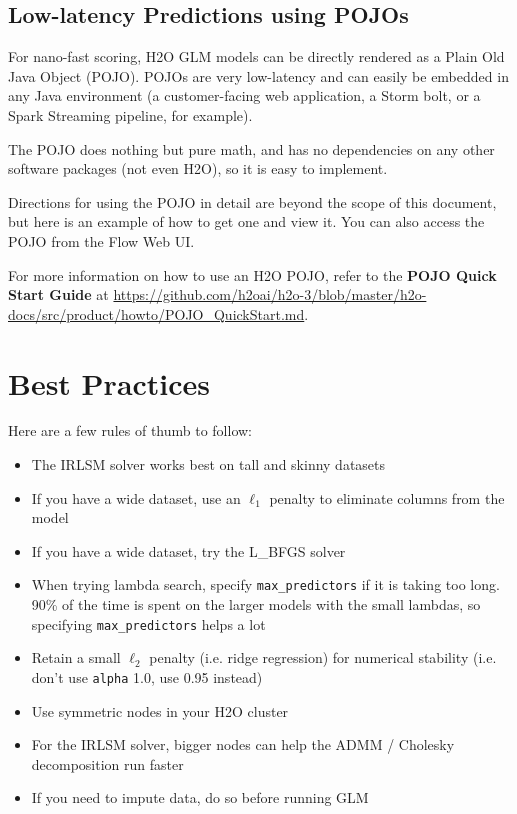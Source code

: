 \subsection{Low-latency Predictions using POJOs}

For nano-fast scoring, H2O GLM models can be directly rendered as a Plain Old Java Object (POJO).  POJOs are very
low-latency and can easily be embedded in any Java environment (a customer-facing web application, a Storm bolt,
or a Spark Streaming pipeline, for example).

The POJO does nothing but pure math, and has no dependencies on any other software packages (not even H2O),
so it is easy to implement.

Directions for using the POJO in detail are beyond the scope of this document, but here is an example of how to get
one and view it.  You can also access the POJO from the Flow Web UI.

For more information on how to use an H2O POJO, refer to the \textbf{POJO Quick Start Guide} at {\url{https://github.com/h2oai/h2o-3/blob/master/h2o-docs/src/product/howto/POJO_QuickStart.md}}. 

\bigskip
\waterExampleInR




\section{Best Practices}

Here are a few rules of thumb to follow:

\begin{itemize}
\item The IRLSM solver works best on tall and skinny datasets
\item If you have a wide dataset, use an  $\ell_1$ penalty to eliminate columns from the model
\item If you have a wide dataset, try the L\_BFGS solver
\item When trying lambda search, specify \texttt{max\_predictors} if it is taking too long. 90\% of the time is spent on the larger models with the small lambdas, so specifying \texttt{max\_predictors} helps a lot
\item Retain a small  $\ell_2$ penalty (i.e. ridge regression) for numerical stability (i.e. don’t use \texttt{alpha} 1.0, use 0.95 instead)
\item Use symmetric nodes in your H2O cluster
\item For the IRLSM solver, bigger nodes can help the ADMM / Cholesky decomposition run faster
\item If you need to impute data, do so before running GLM
\end{itemize}

